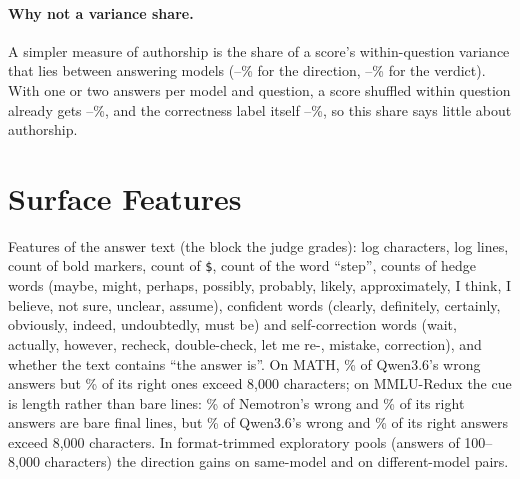 \paragraph{Why not a variance share.} A simpler measure of authorship is the share of a score's within-question variance that lies between answering models (--\% for the direction, --\% for the verdict). With one or two answers per model and question, a score shuffled within question already gets --\%, and the correctness label itself --\%, so this share says little about authorship.

\begin{table}[h]
\centering
\small

\caption{Authorship directions on the exploratory selected pairs (held out). Own pair / other pair: AUROC of the Qwen3.6-vs-Qwen3.5-4B direction for Qwen3.6 vs Qwen3.5-4B answers and for Nemotron vs Qwen3.5-4B answers of equal correctness. cos: with the correctness direction. Ranking of right above wrong answers by the verdict, the correctness direction, and the correctness direction with both authorship directions removed ($\perp$), on all and on same-model pairs.}
\label{tab:auth}
\end{table}

\section{Surface Features}
\label{app:surface}

Features of the answer text (the block the judge grades): log characters, log lines, count of bold markers, count of \texttt{\$}, count of the word ``step'', counts of hedge words (maybe, might, perhaps, possibly, probably, likely, approximately, I think, I believe, not sure, unclear, assume), confident words (clearly, definitely, certainly, obviously, indeed, undoubtedly, must be) and self-correction words (wait, actually, however, recheck, double-check, let me re-, mistake, correction), and whether the text contains ``the answer is''. On MATH, \% of Qwen3.6's wrong answers but \% of its right ones exceed 8,000 characters; on MMLU-Redux the cue is length rather than bare lines: \% of Nemotron's wrong and \% of its right answers are bare final lines, but \% of Qwen3.6's wrong and \% of its right answers exceed 8,000 characters. In format-trimmed exploratory pools (answers of 100--8,000 characters) the direction gains  on same-model and  on different-model pairs.

